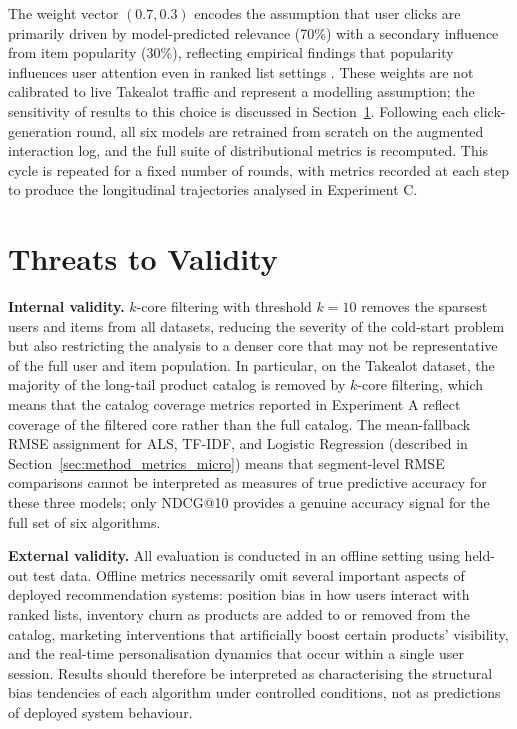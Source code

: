 \documentclass[11pt,a4paper]{report}
\begin{document}
The weight vector $(0.7, 0.3)$ encodes the assumption that user clicks are primarily driven by model-predicted relevance (70\%) with a secondary influence from item popularity (30\%), reflecting empirical findings that popularity influences user attention even in ranked list settings \citep{cialdini1984influence}. These weights are not calibrated to live Takealot traffic and represent a modelling assumption; the sensitivity of results to this choice is discussed in Section~\ref{sec:method_threats}. Following each click-generation round, all six models are retrained from scratch on the augmented interaction log, and the full suite of distributional metrics is recomputed. This cycle is repeated for a fixed number of rounds, with metrics recorded at each step to produce the longitudinal trajectories analysed in Experiment C.

\section{Threats to Validity}
\label{sec:method_threats}

\textbf{Internal validity.} $k$-core filtering with threshold $k = 10$ removes the sparsest users and items from all datasets, reducing the severity of the cold-start problem but also restricting the analysis to a denser core that may not be representative of the full user and item population. In particular, on the Takealot dataset, the majority of the long-tail product catalog is removed by $k$-core filtering, which means that the catalog coverage metrics reported in Experiment A reflect coverage of the filtered core rather than the full catalog. The mean-fallback RMSE assignment for ALS, TF-IDF, and Logistic Regression (described in Section~\ref{sec:method_metrics_micro}) means that segment-level RMSE comparisons cannot be interpreted as measures of true predictive accuracy for these three models; only NDCG@10 provides a genuine accuracy signal for the full set of six algorithms.

\textbf{External validity.} All evaluation is conducted in an offline setting using held-out test data. Offline metrics necessarily omit several important aspects of deployed recommendation systems: position bias in how users interact with ranked lists, inventory churn as products are added to or removed from the catalog, marketing interventions that artificially boost certain products' visibility, and the real-time personalisation dynamics that occur within a single user session. Results should therefore be interpreted as characterising the structural bias tendencies of each algorithm under controlled conditions, not as predictions of deployed system behaviour.
\end{document}
